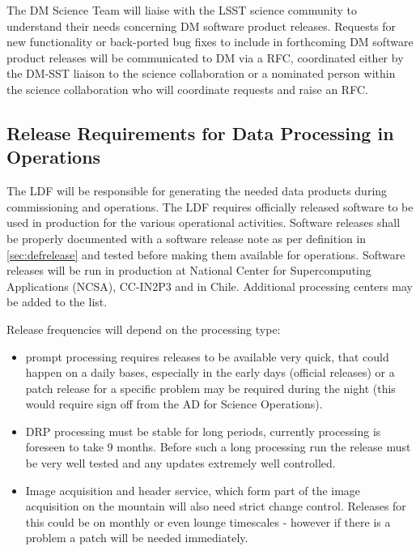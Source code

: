 The \gls{DM} Science Team will liaise with the \gls{LSST} science community to understand their needs concerning \gls{DM} software product releases. 
Requests for new functionality or back-ported bug fixes to include in forthcoming \gls{DM} software product releases will be communicated to \gls{DM} via a \gls{RFC}, coordinated either by the DM-SST liaison to the science collaboration or a nominated person within the science collaboration who will coordinate requests and raise an \gls{RFC}. 


\subsection{Release Requirements for Data Processing in Operations} \label{sec:procreqs}


The \gls{LDF} will be responsible for generating the needed data products during commissioning and operations. 
The \gls{LDF} requires officially released software to be used in production for the various operational activities.
Software releases shall be properly documented with a software release note as per definition in \ref{sec:defrelease} and tested before making them available for operations.
Software releases will be run in production at National Center for Supercomputing Applications (\gls{NCSA}), CC-IN2P3 and in Chile. 
Additional processing centers may be added to the list.

Release frequencies will depend on the processing type:
\begin{itemize}
\item prompt processing requires releases to be available very quick, that could happen on a daily bases, especially in the early days (official releases)
 or a  patch release  for a specific problem may be required during the night (this would require sign off from the \gls{AD} for Science Operations).
\item \gls{DRP} processing  must be stable for long periods, currently processing is foreseen to take 9 months.  Before such a long processing run the release must be very well tested and any updates extremely well controlled.
\item Image acquisition and header service, which form part of the image acquisition on the mountain will also need strict change control. Releases for this could be on monthly or even lounge timescales - however if there is a problem a patch will be needed immediately.
\end{itemize}

